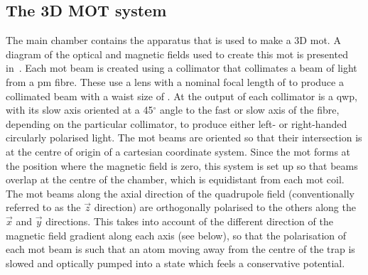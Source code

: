 \subsection{The 3D MOT system}\label{sec:3d_mot}
The main chamber contains the apparatus that is used to make a 3D \ac{mot}. A
diagram of the optical and magnetic fields used to create this \ac{mot} is
presented in~. Each \ac{mot} beam is created using a
collimator that collimates a beam of light from a \ac{pm} fibre. These use a
lens with a nominal focal length of  to produce a
collimated beam with a waist size of . At the output
of each collimator is a \ac{qwp}, with its slow axis oriented at a 45\(^\circ\)
angle to the fast or slow axis of the fibre, depending on the particular
collimator, to produce either left- or right-handed circularly polarised light.
The \ac{mot} beams are oriented so that their intersection is at the centre of
origin of a cartesian coordinate system. Since the \ac{mot} forms at the
position where the magnetic field is zero, this system is set up so that beams
overlap at the centre of the chamber, which is equidistant from each \ac{mot}
coil. The \ac{mot} beams along the axial direction of the quadrupole field
(conventionally referred to as the \(\vec{z}\) direction) are orthogonally
polarised to the others along the \(\vec{x}\) and \(\vec{y}\) directions. This
takes into account of the different direction of the magnetic field gradient
along each axis (see below), so that the polarisation of each \ac{mot} beam is
such that an atom moving away from the centre of the trap is slowed and
optically pumped into a state which feels a conservative potential.
